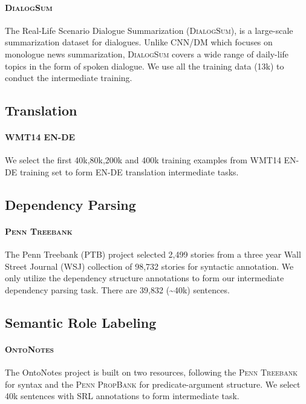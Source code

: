 \documentclass[11pt]{article}
\begin{document}
\paragraph{\textsc{DialogSum}\citep{chen-etal-2021-dialogsum}}
The Real-Life Scenario Dialogue Summarization (\textsc{DialogSum}), is a large-scale summarization dataset for dialogues. Unlike \textsc{CNN/DM} which focuses on monologue news summarization, \textsc{DialogSum} covers a wide range of daily-life topics in the form of spoken dialogue. We use all the training data (13k) to conduct the intermediate training.

\subsection{Translation}

\paragraph{\textsc{WMT14 EN-DE}} We select the first 40k,80k,200k and 400k training examples from WMT14 EN-DE training set to form EN-DE translation intermediate tasks.

\subsection{Dependency Parsing}

\paragraph{\textsc{Penn Treebank}\citep{ptb3}} The Penn Treebank (PTB) project selected 2,499 stories from a three year Wall Street Journal (WSJ) collection of 98,732 stories for syntactic annotation. We only utilize the dependency structure annotations to form our intermediate dependency parsing task. There are 39,832 (\textasciitilde40k) sentences.

\subsection{Semantic Role Labeling}
\paragraph{\textsc{OntoNotes}\citep{Weischedel2017OntoNotesA}} The OntoNotes project is built on two resources, following the \textsc{Penn Treebank}\citep{ptb3} for syntax and the \textsc{Penn PropBank} for predicate-argument structure. We select 40k sentences with SRL annotations to form intermediate task.
\end{document}
